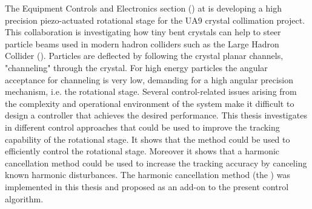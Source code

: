 The Equipment Controls and Electronics section (\abbrENSTIECE) at \abbrCERN is developing a high precision piezo-actuated rotational stage for the UA9 crystal collimation project. This collaboration is investigating how tiny bent crystals can help to steer particle beams used in modern hadron colliders such as the Large Hadron Collider (\abbrLHC). Particles are deflected by following the crystal planar channels, "channeling" through the crystal. For high energy particles the angular acceptance for channeling is very low, demanding for a high angular precision mechanism, i.e. the rotational stage. Several control-related issues arising from the complexity and operational environment of the system make it difficult to design a controller that achieves the desired performance. This thesis investigates in different control approaches that could be used to improve the tracking capability of the rotational stage. It shows that the \abbrIRC method could be used to efficiently control the rotational stage. Moreover it shows that a harmonic cancellation method could be used to increase the tracking accuracy by canceling known harmonic disturbances. The harmonic cancellation method (the \abbrRFDC) was implemented in this thesis and proposed as an add-on to the present control algorithm.
